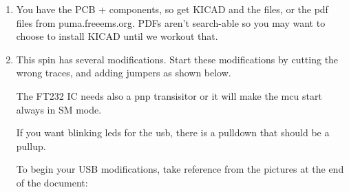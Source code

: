 \documentclass[12pt,a4paper,titlepage]{article}
\begin{document}
\begin{enumerate}

\item You have the PCB + components, so get KICAD and the files, or the pdf files from puma.freeems.org. PDFs aren't search-able so you may want to choose to install KICAD until we workout that.

\item This spin has several modifications. Start these modifications by cutting the wrong traces, and adding jumpers as shown below.

The FT232 IC needs also a pnp transisitor or it will make the mcu start always in SM mode.

If you want blinking leds for the usb, there is a pulldown that should be a pullup.

To begin your USB modifications, take reference from the pictures at the end of the document:


\end{enumerate}
\end{document}
